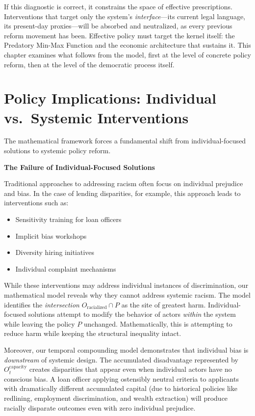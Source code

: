 \documentclass[12pt,openany]{book}
\begin{document}
If this diagnostic is correct, it constrains the space of effective prescriptions. Interventions that target only the system's \textit{interface}---its current legal language, its present-day proxies---will be absorbed and neutralized, as every previous reform movement has been. Effective policy must target the kernel itself: the Predatory Min-Max Function and the economic architecture that sustains it. This chapter examines what follows from the model, first at the level of concrete policy reform, then at the level of the democratic process itself.

\section{Policy Implications: Individual vs.\ Systemic Interventions}

The mathematical framework forces a fundamental shift from individual-focused solutions to systemic policy reform.

\textbf{The Failure of Individual-Focused Solutions}

Traditional approaches to addressing racism often focus on individual prejudice and bias. In the case of lending disparities, for example, this approach leads to interventions such as:
\begin{itemize}
    \item Sensitivity training for loan officers
    \item Implicit bias workshops
    \item Diversity hiring initiatives
    \item Individual complaint mechanisms
\end{itemize}

While these interventions may address individual instances of discrimination, our mathematical model reveals why they cannot address systemic racism. The model identifies the \textit{intersection} $O_{\text{racialized}} \cap P$ as the site of greatest harm. Individual-focused solutions attempt to modify the behavior of actors \textit{within} the system while leaving the policy $P$ unchanged. Mathematically, this is attempting to reduce harm while keeping the structural inequality intact.

Moreover, our temporal compounding model demonstrates that individual bias is \textit{downstream} of systemic design. The accumulated disadvantage represented by $O_t^{\text{capacity}}$ creates disparities that appear even when individual actors have no conscious bias. A loan officer applying ostensibly neutral criteria to applicants with dramatically different accumulated capital (due to historical policies like redlining, employment discrimination, and wealth extraction) will produce racially disparate outcomes even with zero individual prejudice.
\end{document}
